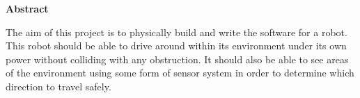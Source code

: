 \thispagestyle{empty}

\begin{center}
    {\LARGE\bf Abstract}
\end{center}
The aim of this project is to physically build and write the software for a robot.  This robot should be able to drive around within its environment under its own power without colliding with any obstruction.  It should also be able to see areas of the environment using some form of sensor system in order to determine which direction to travel safely.
